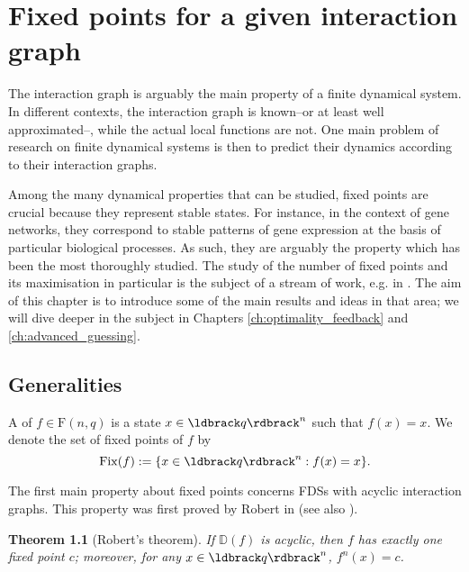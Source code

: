 \documentclass[a4paper, 11pt]{book}
\numberwithin{equation}{section}
\theoremstyle{plain}
\newtheorem{theorem}	[equation]	{Theorem}
\newcommand{\IG}{\mathbb{D}}
\newcommand{\functions}{\mathrm{F}}
\newcommand{\Fix}{\mathrm{Fix}}
\renewcommand{\(}{\ldbrack}
\renewcommand{\)}{\rdbrack}
\newcommand{\BF}[1]{{\bf\boldmath{#1}\unboldmath}}
\begin{document}
\chapter{Fixed points for a given interaction graph} \label{ch:fixed_points_unsigned}

The interaction graph is arguably the main property of a finite dynamical system. In different contexts, the interaction graph is known--or at least well approximated--, while the actual local functions are not. One main problem of research on finite dynamical systems is then to predict their dynamics according to their interaction graphs. 

Among the many dynamical properties that can be studied, fixed points are crucial because they represent stable states. For instance, in the context of gene networks, they correspond to stable patterns of gene expression at the basis of particular biological processes. As such, they are arguably the property which has been the most thoroughly studied. The study of the number of fixed points and its maximisation in particular is the subject of a stream of work, e.g. in \cite{Rob80,ADG04,Rii06,Rii07,GR11,CM11,GRF16}. The aim of this chapter is to introduce some of the  main results and ideas in that area; we will dive deeper in the subject in Chapters \ref{ch:optimality_feedback} and \ref{ch:advanced_guessing}.



\section{Generalities} \label{sec:fixed_points_generalities}


A \BF{fixed point} \label{fixed point} of $f \in \functions(n,q)$ is a state $x \in \(q\)^n$ such that $f(x) = x$. We denote the set of fixed points of $f$ by 
\[
	\Fix(f) := \{ x \in \(q\)^n : f(x) = x \}.
\]



The first main property about fixed points concerns FDSs with acyclic interaction graphs. This property was first proved by Robert in \cite{Rob80} (see also \cite{Rob86,Rob95}).

\begin{theorem}[Robert's theorem] \label{th:fixed_points_acyclic}
If $\IG(f)$ is acyclic, then $f$ has exactly one fixed point $c$; moreover, for any $x \in \(q\)^n$, $f^n(x) = c$.
\end{theorem}
\end{document}
